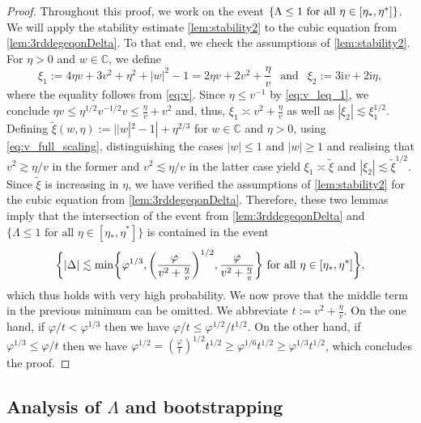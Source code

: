 \documentclass[11pt]{article}
\newcommand{\ii}{\mathrm{i}}
\newcommand{\abs}[1]{\left| #1 \right|}
\newcommand{\absN}[1]{| #1 |}
\newcommand{\C}{\mathbb{C}}
\theoremstyle{plain}
\theoremstyle{remark}
\numberwithin{equation}{section}
\newcommand{\nc}{\normalcolor}
\begin{document}
	\begin{proof}
		Throughout this proof, we work on the event $\{  \Lambda \leq 1 \nc \text{ for all } \eta \in [ \eta_{\ast}, \eta^{\ast}]\}$. 
		We will apply the stability estimate \cref{lem:stability2} to the cubic equation from \cref{lem:3rddegeqonDelta}. To that end, we check the assumptions of \cref{lem:stability2}. 
		For $\eta >0$ and $w \in \C$, we define 
		\begin{equation*} \xi_1 := 4 \eta v + 3 v^2 + \eta^2 + \abs{w}^2 -1 = 2 \eta v + 2 v^{2} + \frac{\eta}{v}
			~~ \text{ and }~~ \xi_2 := 3\ii v + 2\ii \eta, 
		\end{equation*}
		where the equality follows from \eqref{eq:v}. Since $\eta \leq v^{-1}$ by \eqref{eq:v_leq_1}, 
		we conclude $\eta v \leq \eta^{1/2} v^{-1/2} v \leq \frac{\eta}{v} + v^2$ and, thus, $\xi_1 \asymp v^2 + \frac{\eta}{v}$ as well as  $\abs{\xi_2} \lesssim \xi_1^{1/2}$. Defining $\tilde{\xi}(w,\eta) := \absN{\absN{w}^2 - 1} + \eta^{2/3}$ for $w \in \C$ and $\eta>0$, using \eqref{eq:v_full_scaling}, distinguishing the cases $\abs{w} \leq 1$ and $\abs{w} \geq 1$ and realising that $v^2 \gtrsim \eta/v$ in the former and $v^2 \lesssim \eta/v$ in the latter case yield $\xi_1 \asymp \tilde{\xi}$ and $\abs{\xi_2} \lesssim \tilde{\xi}^{ 1/2 }$. Since $\tilde{\xi}$ is increasing in $\eta$, we have verified the assumptions of \cref{lem:stability2} for the cubic equation from \cref{lem:3rddegeqonDelta}. 
		Therefore, these two lemmas imply that the intersection of the event from \cref{lem:3rddegeqonDelta} and $\{ \Lambda \leq 1 \text{ for all } \eta \in [\eta_*,\eta^*]\}$ is contained in the event
		\[ 
		\biggl\{ |\Delta| \lesssim \min \biggl\{   {\varphi}^{1/3}\nc, \biggl(\frac{ {\varphi} \nc}{v^2 + \frac{\eta}{v}}\biggr)^{1/2} ,\frac{{\varphi}\nc}{v^2 + \frac{\eta}{v}}\biggr\} \text{ for all } \eta \in [\eta_*,\eta^*] 
		\biggr\},
		\] 
		which thus holds with very high probability. We now prove that the middle term in the previous minimum can be omitted. We abbreviate $t:= v^2 + \frac{\eta}{v}$. On the one hand, if $ {{\varphi}}/t<{{\varphi}}^{1/3}$ then we have
		${\varphi}/t \le {\varphi}^{1/2}/t^{1/2}$. 
		On the other hand, if ${\varphi}^{1/3}\le {\varphi}/t$ then we have
 	${\varphi}^{1/2} = \left(\frac{{\varphi}}{t}\right)^{1/2} t^{1/2} \ge {{\varphi}^{1/6}} t^{1/2}\geq  {\varphi}^{1/3}t^{1/2}$, which concludes the proof.
	\end{proof}
	
	\subsection{Analysis of $\Lambda$ and bootstrapping} 
	
\end{document}
